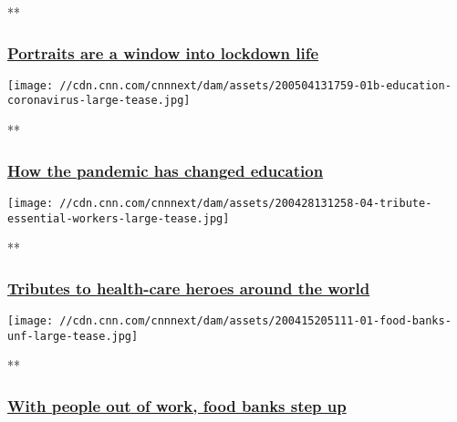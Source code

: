**

\hypertarget{portraits-are-a-window-into-lockdown-life}{%
\subsubsection{\texorpdfstring{\href{/2020/05/05/europe/gallery/dublin-home-portraits-coronavirus/index.html}{Portraits
are a window into lockdown
life}}{Portraits are a window into lockdown life}}\label{portraits-are-a-window-into-lockdown-life}}

\href{/2020/05/04/world/gallery/education-coronavirus-wellness/index.html}{}

\texttt{[image: //cdn.cnn.com/cnnnext/dam/assets/200504131759-01b-education-coronavirus-large-tease.jpg]}

**

\hypertarget{how-the-pandemic-has-changed-education}{%
\subsubsection{\texorpdfstring{\href{/2020/05/04/world/gallery/education-coronavirus-wellness/index.html}{How
the pandemic has changed
education}}{How the pandemic has changed education}}\label{how-the-pandemic-has-changed-education}}

\href{/2020/04/30/health/gallery/essential-worker-tributes-trnd/index.html}{}

\texttt{[image: //cdn.cnn.com/cnnnext/dam/assets/200428131258-04-tribute-essential-workers-large-tease.jpg]}

**

\hypertarget{tributes-to-health-care-heroes-around-the-world}{%
\subsubsection{\texorpdfstring{\href{/2020/04/30/health/gallery/essential-worker-tributes-trnd/index.html}{Tributes
to health-care heroes around the
world}}{Tributes to health-care heroes around the world}}\label{tributes-to-health-care-heroes-around-the-world}}

\href{/2020/04/15/us/gallery/food-banks-coronavirus/index.html}{}

\texttt{[image: //cdn.cnn.com/cnnnext/dam/assets/200415205111-01-food-banks-unf-large-tease.jpg]}

**

\hypertarget{with-people-out-of-work-food-banks-step-up}{%
\subsubsection{\texorpdfstring{\href{/2020/04/15/us/gallery/food-banks-coronavirus/index.html}{With
people out of work, food banks step
up}}{With people out of work, food banks step up}}\label{with-people-out-of-work-food-banks-step-up}}

